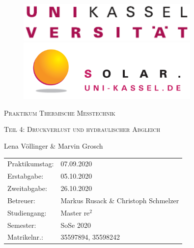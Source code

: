 \documentclass[10pt,a4paper,toc=listof,toc=bibliography]{scrartcl}
\begin{document}
\begin{titlepage}
	
	\begin{figure}[H]
		\begin{minipage}{0.5\textwidth}
			\centering
			\includegraphics[width=0.8\textwidth]{../DATA/Logo_Uni-Kassel.pdf}
		\end{minipage}\hfill
		\begin{minipage}{0.5\textwidth}
			\centering
			\includegraphics[width=0.8\textwidth]{../DATA/Logo_solar.png}
		\end{minipage}
	\end{figure}
	
		\vspace{3cm}
	
	\centering
	{\scshape\LARGE Praktikum Thermische Messtechnik \par}   %
	\vspace{1cm}
	{\scshape\Large Teil 4: Druckverlust und hydraulischer Abgleich \par}
	\vspace{1.5cm}
	\vspace{2cm}
	{\Large Lena Völlinger \& Marvin Grosch\par}
	\vfill
	
	\begin{large}
		\begin{tabular}{l l}
			
			Praktikumstag: & 07.09.2020 \\
			Erstabgabe: & 05.10.2020\\
			Zweitabgabe: & 26.10.2020\\
			Betreuer: & Markus Rusack \& Christoph Schmelzer\\
			Studiengang: & Master $\text{re}^2$\\
			Semester: & SoSe 2020\\
			Matrikelnr.: & 35597894, 35598242\\ 
		\end{tabular}
	\end{large}

\end{titlepage}
\end{document}
